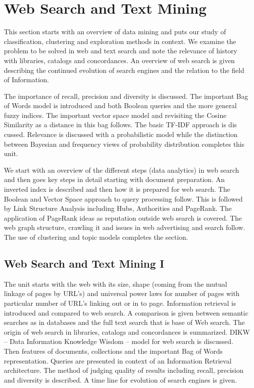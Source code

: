 \section{Web Search and Text Mining}\label{web-search-and-text-mining}

\FILENAME

This section starts with an overview of data mining and puts our study
of classification, clustering and exploration methods in context. We
examine the problem to be solved in web and text search and note the
relevance of history with libraries, catalogs and concordances. An
overview of web search is given describing the continued evolution of
search engines and the relation to the field of Information.

The importance of recall, precision and diversity is discussed. The
important Bag of Words model is introduced and both Boolean queries and
the more general fuzzy indices. The important vector space model and
revisiting the Cosine Similarity as a distance in this bag follows. The
basic TF-IDF approach is dis cussed. Relevance is discussed with a
probabilistic model while the distinction between Bayesian and frequency
views of probability distribution completes this unit.

We start with an overview of the different steps (data analytics) in web
search and then goes key steps in detail starting with document
preparation. An inverted index is described and then how it is prepared
for web search. The Boolean and Vector Space approach to query
processing follow. This is followed by Link Structure Analysis including
Hubs, Authorities and PageRank. The application of PageRank ideas as
reputation outside web search is covered. The web graph structure,
crawling it and issues in web advertising and search follow. The use of
clustering and topic models completes the section.

\subsection{Web Search and Text Mining I}\label{web-search-and-text-mining-i}

The unit starts with the web with its size, shape (coming from the
mutual linkage of pages by URL's) and universal power laws for number of
pages with particular number of URL's linking out or in to page.
Information retrieval is introduced and compared to web search. A
comparison is given between semantic searches as in databases and the
full text search that is base of Web search. The origin of web search in
libraries, catalogs and concordances is summarized. DIKW -- Data
Information Knowledge Wisdom -- model for web search is discussed. Then
features of documents, collections and the important Bag of Words
representation. Queries are presented in context of an Information
Retrieval architecture. The method of judging quality of results
including recall, precision and diversity is described. A time line for
evolution of search engines is given.

